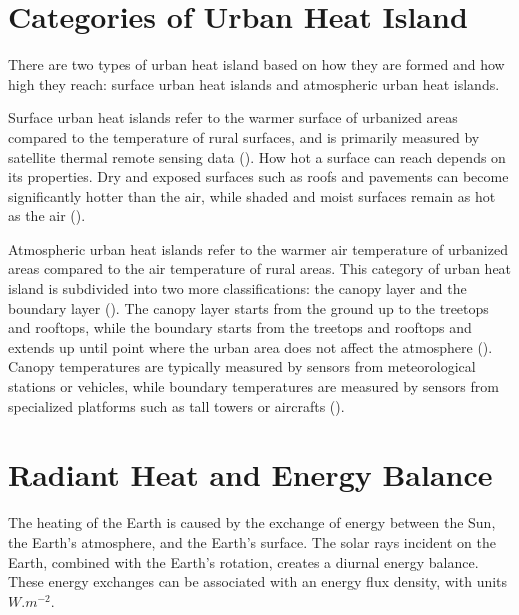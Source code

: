 \section{Categories of Urban Heat Island}
	
	There are two types of urban heat island based on how they are formed and how high they reach:
	surface urban heat islands and atmospheric urban heat islands.

	Surface urban heat islands refer to the warmer surface of urbanized areas compared to the temperature of rural surfaces, and is primarily measured by satellite thermal remote sensing data (\cite{Zhou2018}). 
	How hot a surface can reach depends on its properties.
	Dry and exposed surfaces such as roofs and pavements can become significantly hotter than the air, while shaded and moist surfaces remain as hot as the air (\cite{Khan2021}). 
	
	Atmospheric urban heat islands refer to the warmer air temperature of urbanized areas compared to the air temperature of rural areas.
	This category of urban heat island is subdivided into two more classifications:
	the canopy layer and the boundary layer (\cite{Zhou2018}).
	The canopy layer starts from the ground up to the treetops and rooftops, 
	while the boundary starts from the treetops and rooftops and extends up until point where the urban area does not affect the atmosphere (\cite{Khan2021}).
	Canopy temperatures are typically measured by sensors from meteorological stations or vehicles,
	while boundary temperatures are measured by sensors from specialized platforms such as tall towers or aircrafts (\cite{Zhou2018}).

\section{Radiant Heat and Energy Balance}
	The heating of the Earth is caused by the exchange of energy between the Sun, the Earth's atmosphere, and the Earth's surface.
	The solar rays incident on the Earth, combined with the Earth's rotation, creates a diurnal energy balance.
	These energy exchanges can be associated with an energy flux density, with units $\si{W.m^{-2}}$.
	
	
